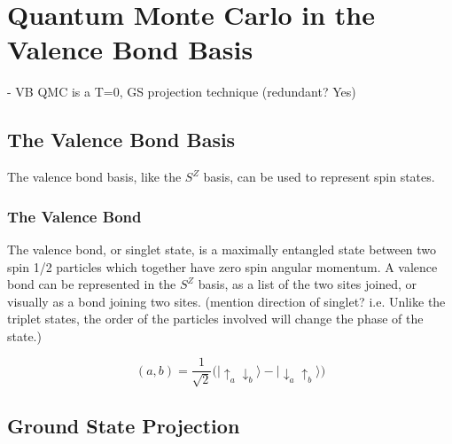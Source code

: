 \chapter{Quantum Monte Carlo in the Valence Bond Basis}

- VB QMC is a T=0, GS projection technique (redundant? Yes)\\
\section{The Valence Bond Basis}

The valence bond basis, like the $S^Z$ basis, can be used to represent spin states.

\subsection{The Valence Bond}
The valence bond, or singlet state, is a maximally entangled state between two spin 1/2 particles
which together have zero spin angular momentum.  A valence bond can be represented in the $S^Z$ basis, as a list of the two sites joined, or 
visually as a bond joining two sites.  {\color{red} (mention direction of singlet? i.e. Unlike the triplet states, the order of the particles involved will change the phase of the state.)}

\begin{equation}
   (a,b) = \frac{1}{\sqrt{2}}\big( \lvert \uparrow_a \downarrow_b \rangle - \lvert \downarrow_a \uparrow_b \rangle \big)
   \label{eqn_vb}
\end{equation}

\section{Ground State Projection}
